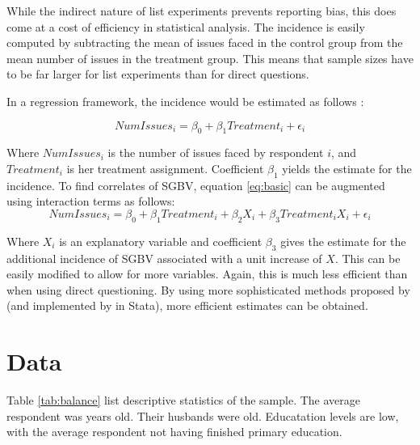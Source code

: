 \documentclass[10pt,a4paper,abstract=on]{scrartcl} %
\newcommand{\tableloc}{C:/Users/Koen/Dropbox/PhD/Papers/CongoGBV/Tables}
\begin{document}
While the indirect nature of list experiments prevents reporting bias, this does come at a cost of efficiency in statistical analysis. The incidence is easily computed by subtracting the mean of issues faced in the control group from the mean number of issues in the treatment group. This means that sample sizes have to be far larger for list experiments than for direct questions. 

In a regression framework, the incidence would be estimated as follows \cite{Holbrook2010}:

\begin{equation}
\label{eq:basic}
NumIssues_i = \beta_0 + \beta_1 Treatment_i + \epsilon_i
\end{equation}

Where \(NumIssues_i\) is the number of issues faced by respondent $i$, and \(Treatment_i\) is her treatment assignment. Coefficient \(\beta_1\) yields the estimate for the incidence. To find correlates of SGBV, equation \ref{eq:basic} can be augmented using interaction terms as follows: 
\begin{equation}
\label{eq:interaction}
NumIssues_i = \beta_0 + \beta_1 Treatment_i + \beta_2 X_i + \beta_3 Treatment_i X_i + \epsilon_i
\end{equation}

Where \(X_i\) is an explanatory variable and coefficient \(\beta_3\) gives the estimate for the additional incidence of SGBV associated with a unit increase of \(X\). This can be easily modified to allow for more variables. Again, this is much less efficient than when using direct questioning. By using more sophisticated methods proposed by \citet{Imai2011} (and implemented by \cite{Tsai2019} in Stata), more efficient estimates can be obtained. 





\section*{Data}
Table \ref{tab:balance} list descriptive statistics of the sample. The average respondent was  years old. Their husbands were  old. Educatation levels are low, with the average respondent not having finished primary education.
\end{document}
